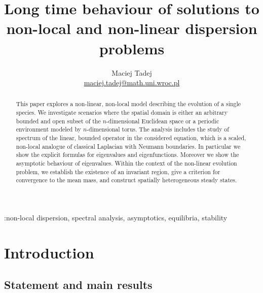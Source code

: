 \documentclass[12pt, a4paper]{article}
\title{Long time behaviour of solutions to non-local and non-linear dispersion problems}
\author{Maciej Tadej \\ \href{mailto:maciej.tadej@math.uni.wroc.pl}{maciej.tadej@math.uni.wroc.pl}}
\affil{\textit{Insitute of Mathematics, University of Wrocław, pl. Grunwaldzki 2, 50-384 Wrocław}}
\date{}
\theoremstyle{break}
\theoremstyle{break}
\theoremstyle{break}
\theoremstyle{break}
\theoremstyle{break}
\begin{document}
\maketitle

\hspace{20pt}

\begin{abstract}
This paper explores a non-linear, non-local model describing the evolution of a single species. We investigate scenarios where the spatial domain is either an arbitrary bounded and open subset of the $n$-dimensional Euclidean space or a periodic environment modeled by $n$-dimensional torus. The analysis includes the study of spectrum of the linear, bounded operator in the considered equation, which is a scaled, non-local analogue of classical Laplacian with Neumann boundaries. In particular we show the explicit formulas for eigenvalues and eigenfunctions. Moreover we show the asymptotic behaviour of eigenvalues. Within the context of the non-linear evolution problem, we establish the existence of an invariant region, give a criterion for convergence to the mean mass, and construct spatially heterogeneous steady states.
\end{abstract}

\begin{keywords} :non-local dispersion, spectral analysis, asymptotics, equilibria, stability
\end{keywords}

\newpage

\section{Introduction}

\subsection{Statement and main results}
\end{document}

